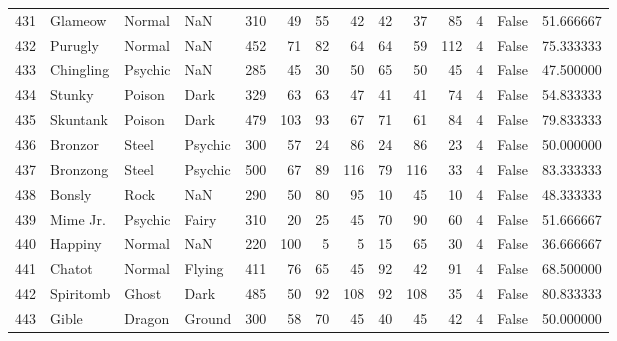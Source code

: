 \begin{tabular}{rlllrrrrrrrrlr}
 431 &                    Glameow &    Normal &       NaN &    310 &   49 &      55 &       42 &       42 &       37 &     85 &           4 &      False &   51.666667 \\
 432 &                    Purugly &    Normal &       NaN &    452 &   71 &      82 &       64 &       64 &       59 &    112 &           4 &      False &   75.333333 \\
 433 &                  Chingling &   Psychic &       NaN &    285 &   45 &      30 &       50 &       65 &       50 &     45 &           4 &      False &   47.500000 \\
 434 &                     Stunky &    Poison &      Dark &    329 &   63 &      63 &       47 &       41 &       41 &     74 &           4 &      False &   54.833333 \\
 435 &                   Skuntank &    Poison &      Dark &    479 &  103 &      93 &       67 &       71 &       61 &     84 &           4 &      False &   79.833333 \\
 436 &                    Bronzor &     Steel &   Psychic &    300 &   57 &      24 &       86 &       24 &       86 &     23 &           4 &      False &   50.000000 \\
 437 &                   Bronzong &     Steel &   Psychic &    500 &   67 &      89 &      116 &       79 &      116 &     33 &           4 &      False &   83.333333 \\
 438 &                     Bonsly &      Rock &       NaN &    290 &   50 &      80 &       95 &       10 &       45 &     10 &           4 &      False &   48.333333 \\
 439 &                   Mime Jr. &   Psychic &     Fairy &    310 &   20 &      25 &       45 &       70 &       90 &     60 &           4 &      False &   51.666667 \\
 440 &                    Happiny &    Normal &       NaN &    220 &  100 &       5 &        5 &       15 &       65 &     30 &           4 &      False &   36.666667 \\
 441 &                     Chatot &    Normal &    Flying &    411 &   76 &      65 &       45 &       92 &       42 &     91 &           4 &      False &   68.500000 \\
 442 &                  Spiritomb &     Ghost &      Dark &    485 &   50 &      92 &      108 &       92 &      108 &     35 &           4 &      False &   80.833333 \\
 443 &                      Gible &    Dragon &    Ground &    300 &   58 &      70 &       45 &       40 &       45 &     42 &           4 &      False &   50.000000 \\

\end{tabular}
